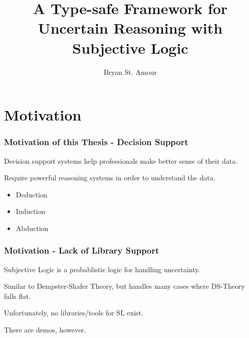 \documentclass{beamer}
\title{A Type-safe Framework for Uncertain Reasoning with Subjective Logic}
\author{Bryan St. Amour}
\begin{document}
\begin{frame}
\titlepage
\end{frame}

\begin{frame}
\tableofcontents
\end{frame}


\section{Motivation}

\begin{frame}
\frametitle{Motivation of this Thesis - Decision Support}

\par
Decision support systems help professionals make better sense of their data.

\pause

\par
Require powerful reasoning systems in order to understand the data.

\pause

\begin{itemize}
  \item Deduction
  \item Induction
  \item Abduction
\end{itemize}

\end{frame}

\begin{frame}
\frametitle{Motivation - Lack of Library Support}

\par
Subjective Logic is a probablistic logic for handling uncertainty.

\par
Similar to Dempster-Shafer Theory, but handles many cases where DS-Theory falls flat.

\pause

\par
Unfortunately, no libraries/tools for SL exist.

\par
There are demos, however.

\end{frame}

\end{document}
